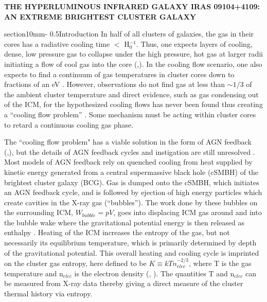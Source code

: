 \documentclass[letterpaper,11pt,twocolumn]{article}
\makeatletter
\renewcommand{\section}{\@startsection%
{section}{1}{0mm}{-\baselineskip}%
{0.5\baselineskip}{\normalfont\Large\bfseries}}%
\makeatother
\begin{document}
\pagestyle{plain}
\begin{center}
\bfseries\uppercase{The Hyperluminous Infrared Galaxy IRAS 09104+4109: An Extreme Brightest Cluster Galaxy}
\end{center}
\section{Introduction}
In half of all clusters of galaxies, the gas in their cores has a
radiative cooling time $<$ H$_{0}^{-1}$. Thus, one expects layers
of cooling, dense, low pressure gas to collapse under the
high pressure, hot gas at larger radii initiating a flow of cool
gas into the core
(\cite{1977MNRAS.180..479F},\cite{1977ApJ...215..723C}). In the
cooling flow scenario, one also expects to find a continuum of
gas temperatures in cluster cores down to fractions of an eV
\cite{1994MNRAS.266..399F}. However, observations do not find
gas at less than $\sim 1/3$ of the ambient cluster temperature and
direct evidence, such as gas condensing out of the ICM, for the hypothesized cooling
flows has never been found thus creating a ``cooling flow problem''
\cite{1995ApJ...452..164V}.
Some mechanism must be acting within cluster cores to retard a
continuous cooling gas phase.

The ``cooling flow problem" has a viable 
solution in the form of AGN feedback
(\cite{1995MNRAS.276..663B},\cite{2005ApJ...634..955V}), but
the details of AGN feedback cycles and instigation are still
unresolved \cite{2002MNRAS.330..329B}. Most models of AGN
feedback rely on quenched cooling from heat supplied by kinetic
energy generated from a central supermassive black hole (cSMBH) of the brightest cluster
galaxy (BCG). Gas is dumped onto the cSMBH, which initiates an AGN
feedback cycle, and is followed by ejection of high energy particles which create
cavities in the X-ray gas (``bubbles''). The work done by these bubbles on
the surrounding ICM, $W_{bubble} = pV$, goes into displacing ICM gas around and
into the bubble wake where the
gravitational potential energy is then released as enthalpy \cite{2004ApJ...607..800B}.
Heating of the ICM increases the entropy of the gas, but not necessarily
its equilibrium temperature, which is primarily determined by depth of the gravitational potential. This
overall heating and cooling cycle is imprinted on the cluster gas
entropy, here defined to be $K \equiv kTn_{elec}^{-2/3}$, where T is the gas temperature
and n$_{elec}$ is the electron density (\cite{2002ApJ...576..601V},
\cite{2005RvMP...77..207V}). The quantities T and n$_{elec}$ can be
measured from X-ray data thereby giving a direct measure of the
cluster thermal history via entropy.
\end{document}

